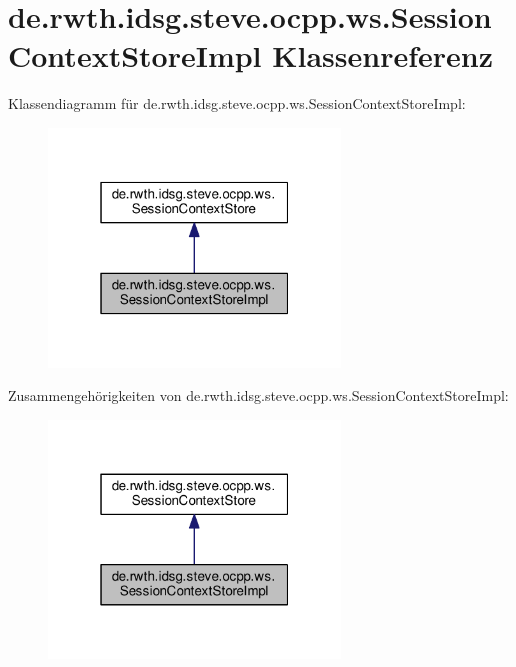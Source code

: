 \hypertarget{classde_1_1rwth_1_1idsg_1_1steve_1_1ocpp_1_1ws_1_1_session_context_store_impl}{\section{de.\-rwth.\-idsg.\-steve.\-ocpp.\-ws.\-Session\-Context\-Store\-Impl Klassenreferenz}
\label{classde_1_1rwth_1_1idsg_1_1steve_1_1ocpp_1_1ws_1_1_session_context_store_impl}
}


Klassendiagramm für de.\-rwth.\-idsg.\-steve.\-ocpp.\-ws.\-Session\-Context\-Store\-Impl\-:
\nopagebreak
\begin{figure}[H]
\begin{center}
\leavevmode
\includegraphics[width=220pt]{classde_1_1rwth_1_1idsg_1_1steve_1_1ocpp_1_1ws_1_1_session_context_store_impl__inherit__graph}
\end{center}
\end{figure}


Zusammengehörigkeiten von de.\-rwth.\-idsg.\-steve.\-ocpp.\-ws.\-Session\-Context\-Store\-Impl\-:
\nopagebreak
\begin{figure}[H]
\begin{center}
\leavevmode
\includegraphics[width=220pt]{classde_1_1rwth_1_1idsg_1_1steve_1_1ocpp_1_1ws_1_1_session_context_store_impl__coll__graph}
\end{center}
\end{figure}
